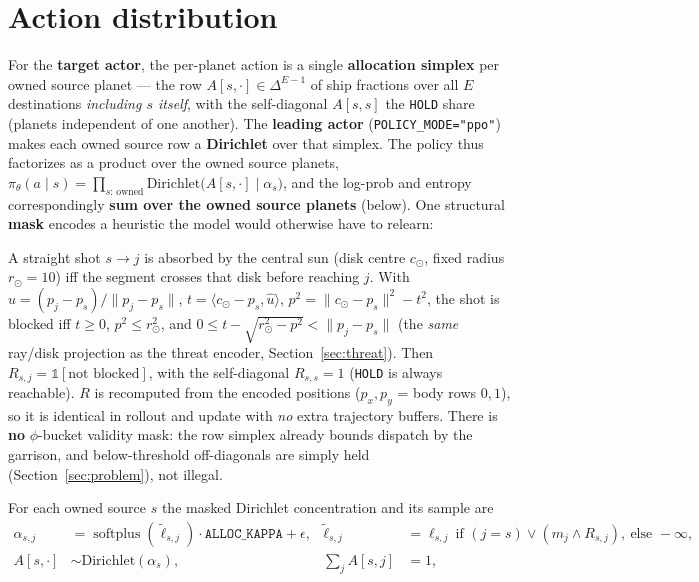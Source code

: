 \documentclass[11pt]{article}
\newcommand{\pol}{\pi_\theta}
\begin{document}
\section{Action distribution}\label{sec:dist}
For the \textbf{target actor}, the per-planet action is a single \textbf{allocation simplex} per owned
source planet --- the row $A[s,\cdot]\in\Delta^{E-1}$ of ship fractions over all $E$ destinations
\emph{including $s$ itself}, with the self-diagonal $A[s,s]$ the \texttt{HOLD} share (planets
independent of one another). The \textbf{leading actor} (\texttt{POLICY\_MODE="ppo"}) makes each owned
source row a \textbf{Dirichlet} over that simplex. The policy thus factorizes as a product over the
owned source planets,
$\pol(a\mid s)=\prod_{s:\,\text{owned}}\mathrm{Dirichlet}\big(A[s,\cdot]\mid\alpha_s\big)$,
and the log-prob and entropy correspondingly \textbf{sum over the owned source planets} (below). One
structural \textbf{mask} encodes a heuristic the model would otherwise have to relearn:
\begin{description}[nosep,leftmargin=1.4em]
\item[Reachability $R_{s,j}$ (sun occlusion).] A straight shot $s\!\to\!j$ is absorbed by the central
sun (disk centre $c_\odot$, fixed radius $r_\odot{=}10$) iff the segment crosses that disk before
reaching $j$. With $\hat u=(p_j-p_s)/\lVert p_j-p_s\rVert$, $t=\langle c_\odot-p_s,\hat u\rangle$,
$p^2=\lVert c_\odot-p_s\rVert^2-t^2$, the shot is blocked iff $t\ge0$, $p^2\le r_\odot^2$, and
$0\le t-\sqrt{r_\odot^2-p^2}<\lVert p_j-p_s\rVert$ (the \emph{same} ray/disk projection as the threat
encoder, Section~\ref{sec:threat}). Then $R_{s,j}=\mathbb 1[\text{not blocked}]$, with the self-diagonal
$R_{s,s}=1$ (\texttt{HOLD} is always reachable). $R$ is recomputed from the encoded positions
($p_x,p_y$ = body rows $0,1$), so it is identical in rollout and update with \emph{no} extra trajectory
buffers. There is \textbf{no} $\phi$-bucket validity mask: the row simplex already bounds dispatch by
the garrison, and below-threshold off-diagonals are simply held (Section~\ref{sec:problem}), not
illegal.
\end{description}
For each owned source $s$ the masked Dirichlet concentration and its sample are
\begin{align}
\alpha_{s,j} &= \operatorname{softplus}(\tilde\ell_{s,j})\cdot\texttt{ALLOC\_KAPPA} + \epsilon,
  & \tilde\ell_{s,j} &= \ell_{s,j}\ \text{if } (j{=}s)\vee(m_j{\wedge}R_{s,j}),\ \text{else } -\infty,\\
A[s,\cdot] &\sim \mathrm{Dirichlet}(\alpha_{s}),
  & \textstyle\sum_j A[s,j] &= 1,
\end{align}
\end{document}
